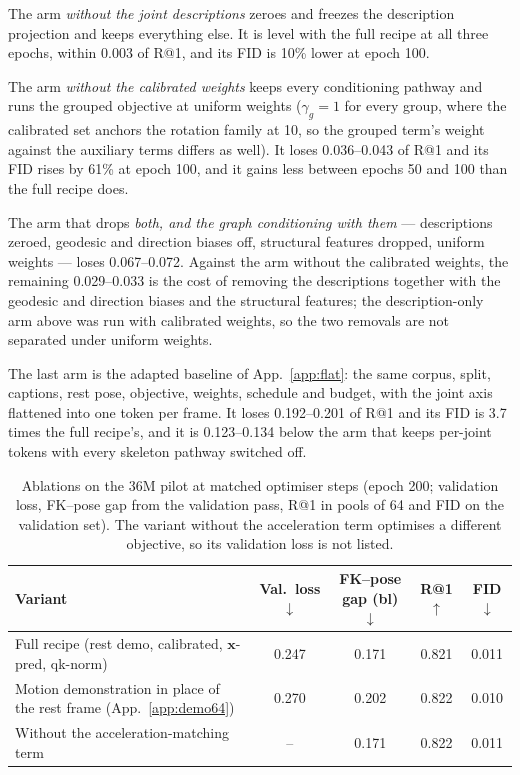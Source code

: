 The arm \emph{without the joint descriptions} zeroes and freezes the description projection and keeps
everything else. It is level with the full recipe at all three epochs, within \num{0.003} of R@1,
and its FID is \num{10}\% lower at epoch 100.

The arm \emph{without the calibrated weights} keeps every conditioning pathway and runs the grouped objective
at uniform weights ($\gamma_g{=}1$ for every group, where the calibrated set anchors the rotation family at 10, so
the grouped term's weight against the auxiliary terms differs as well). It loses \num{0.036}--\num{0.043} of R@1 and its FID rises by \num{61}\% at epoch 100, and
it gains less between epochs 50 and 100 than the full recipe does.

The arm that drops \emph{both, and the graph conditioning with them} --- descriptions zeroed, geodesic and
direction biases off, structural features dropped, uniform weights --- loses \num{0.067}--\num{0.072}. Against
the arm without the calibrated weights, the remaining \num{0.029}--\num{0.033} is the cost of removing the
descriptions together with the geodesic and direction biases and the structural features; the description-only
arm above was run with calibrated weights, so the two removals are not separated under uniform weights.

The last arm is the adapted baseline of App.~\ref{app:flat}: the same corpus, split, captions, rest pose,
objective, weights, schedule and budget, with the joint axis flattened into one token per frame. It loses
\num{0.192}--\num{0.201} of R@1 and its FID is \num{3.7} times the full recipe's, and it is
\num{0.123}--\num{0.134} below the arm that keeps per-joint tokens with every skeleton pathway switched off.


\begin{table}[h]
\centering\small
\caption{Ablations on the \num{36}M pilot at matched optimiser steps (epoch 200;
validation loss, FK--pose gap from the validation pass, R@1 in pools of 64 and FID on the validation set). The variant without the
acceleration term optimises a different objective, so its validation loss is not listed.}\label{tab:ablation}
\footnotesize\setlength{\tabcolsep}{3pt}
\begin{tabular}{@{}lcccc@{}}
\toprule
Variant & Val.\ loss$\downarrow$ & FK--pose gap (bl)$\downarrow$ & R@1$\uparrow$ & FID$\downarrow$ \\
\midrule
Full recipe (rest demo, calibrated, $\mathbf{x}$-pred, qk-norm) & \num{0.247} & \num{0.171} & \num{0.821} & \num{0.011} \\
Motion demonstration in place of the rest frame (App.~\ref{app:demo64}) & \num{0.270} & \num{0.202} & \num{0.822} & \num{0.010} \\
Without the acceleration-matching term & -- & \num{0.171} & \num{0.822} & \num{0.011} \\
\bottomrule
\end{tabular}
\end{table}

